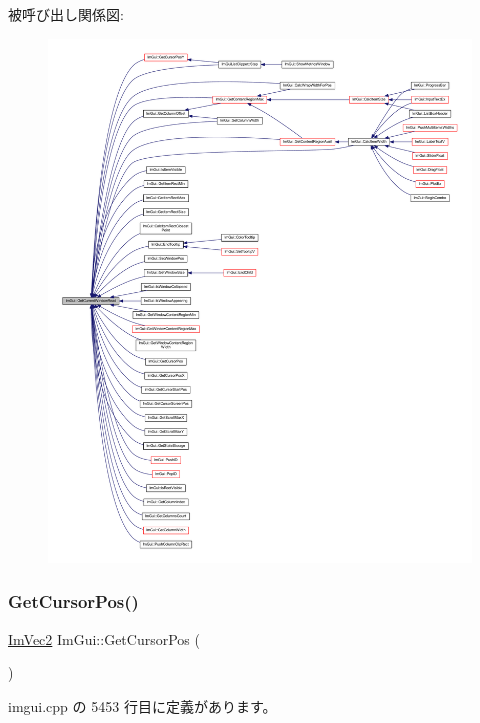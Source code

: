 被呼び出し関係図\+:\nopagebreak
\begin{figure}[H]
\begin{center}
\leavevmode
\includegraphics[width=350pt]{namespace_im_gui_a408f9ddac92f8629a7e273ced5f8c3aa_icgraph}
\end{center}
\end{figure}
\mbox{\label{namespace_im_gui_a2fa4eb57e0f73b90e8edcd226a0cc7d5}} 
\subsubsection{\texorpdfstring{Get\+Cursor\+Pos()}{GetCursorPos()}}
{\footnotesize\ttfamily \mbox{\hyperlink{struct_im_vec2}{Im\+Vec2}} Im\+Gui\+::\+Get\+Cursor\+Pos (\begin{DoxyParamCaption}{ }\end{DoxyParamCaption})}



 imgui.\+cpp の 5453 行目に定義があります。

